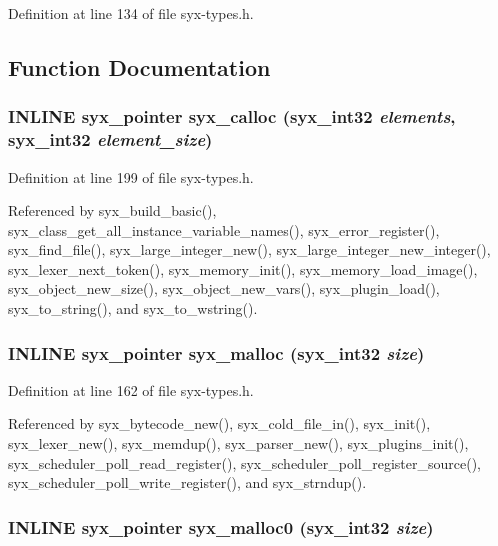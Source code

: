 Definition at line 134 of file syx-types.h.

\subsection{Function Documentation}
\hypertarget{syx-types_8h_0a7e373cdf0766342290aa127715542a}{
\subsubsection{\setlength{\rightskip}{0pt plus 5cm}INLINE {\bf syx\_\-pointer} syx\_\-calloc ({\bf syx\_\-int32} {\em elements}, \/  {\bf syx\_\-int32} {\em element\_\-size})}}
\label{syx-types_8h_0a7e373cdf0766342290aa127715542a}




Definition at line 199 of file syx-types.h.

Referenced by syx\_\-build\_\-basic(), syx\_\-class\_\-get\_\-all\_\-instance\_\-variable\_\-names(), syx\_\-error\_\-register(), syx\_\-find\_\-file(), syx\_\-large\_\-integer\_\-new(), syx\_\-large\_\-integer\_\-new\_\-integer(), syx\_\-lexer\_\-next\_\-token(), syx\_\-memory\_\-init(), syx\_\-memory\_\-load\_\-image(), syx\_\-object\_\-new\_\-size(), syx\_\-object\_\-new\_\-vars(), syx\_\-plugin\_\-load(), syx\_\-to\_\-string(), and syx\_\-to\_\-wstring().\hypertarget{syx-types_8h_7446426502808204156e54c87ac180bf}{
\subsubsection{\setlength{\rightskip}{0pt plus 5cm}INLINE {\bf syx\_\-pointer} syx\_\-malloc ({\bf syx\_\-int32} {\em size})}}
\label{syx-types_8h_7446426502808204156e54c87ac180bf}




Definition at line 162 of file syx-types.h.

Referenced by syx\_\-bytecode\_\-new(), syx\_\-cold\_\-file\_\-in(), syx\_\-init(), syx\_\-lexer\_\-new(), syx\_\-memdup(), syx\_\-parser\_\-new(), syx\_\-plugins\_\-init(), syx\_\-scheduler\_\-poll\_\-read\_\-register(), syx\_\-scheduler\_\-poll\_\-register\_\-source(), syx\_\-scheduler\_\-poll\_\-write\_\-register(), and syx\_\-strndup().\hypertarget{syx-types_8h_d3289765fe9f49b5fcc601baa1dc2757}{
\subsubsection{\setlength{\rightskip}{0pt plus 5cm}INLINE {\bf syx\_\-pointer} syx\_\-malloc0 ({\bf syx\_\-int32} {\em size})}}
\label{syx-types_8h_d3289765fe9f49b5fcc601baa1dc2757}




